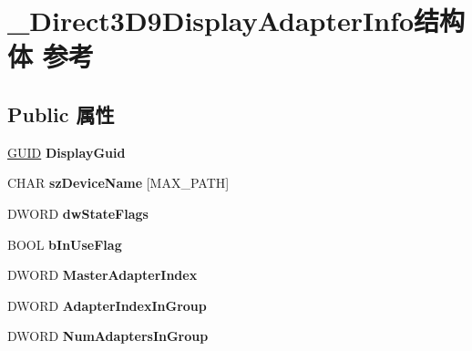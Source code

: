 \hypertarget{struct___direct3_d9_display_adapter_info}{}\section{\+\_\+\+Direct3\+D9\+Display\+Adapter\+Info结构体 参考}
\label{struct___direct3_d9_display_adapter_info}
\subsection*{Public 属性}
\begin{DoxyCompactItemize}
\item 
\mbox{\label{struct___direct3_d9_display_adapter_info_a0fef9a4172e21aa2d3a870043651c068}} 
\hyperlink{interface_g_u_i_d}{G\+U\+ID} {\bfseries Display\+Guid}
\item 
\mbox{\label{struct___direct3_d9_display_adapter_info_a827fae7eb2b350bb00197676ec40e34e}} 
C\+H\+AR {\bfseries sz\+Device\+Name} \mbox{[}M\+A\+X\+\_\+\+P\+A\+TH\mbox{]}
\item 
\mbox{\label{struct___direct3_d9_display_adapter_info_a53d06ae61d4b71828666e5f95cd73b6b}} 
D\+W\+O\+RD {\bfseries dw\+State\+Flags}
\item 
\mbox{\label{struct___direct3_d9_display_adapter_info_a37c837e83f123324bfb4559ba0482ecf}} 
B\+O\+OL {\bfseries b\+In\+Use\+Flag}
\item 
\mbox{\label{struct___direct3_d9_display_adapter_info_a736fa7a00d865535967b84205013fe88}} 
D\+W\+O\+RD {\bfseries Master\+Adapter\+Index}
\item 
\mbox{\label{struct___direct3_d9_display_adapter_info_aa63efa269c9f8ee5591ebd9b2138ce14}} 
D\+W\+O\+RD {\bfseries Adapter\+Index\+In\+Group}
\item 
\mbox{\label{struct___direct3_d9_display_adapter_info_a4febc62501e7db02b54fffef81a8637d}} 
D\+W\+O\+RD {\bfseries Num\+Adapters\+In\+Group}

\end{DoxyCompactItemize}
